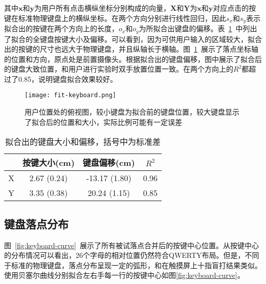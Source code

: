 其中$\textbf{x}$和$\textbf{y}$为用户所有点击横纵坐标分别构成的向量，$\textbf{X}$和$\textbf{Y}$为$\textbf{x}$和$\textbf{y}$对应点击的按键在标准物理键盘上的横纵坐标。在两个方向分别进行线性回归，因此$s_{x}$和$s_{y}$表示拟合出的按键在两个方向上的长度，$o_{x}$和$o_{y}$为所拟合出键盘的偏移。表~\ref{tab:fitkeyboard}~中列出了拟合的全键盘按键大小及偏移。可以看到，因为可供用户输入的区域较大，拟合出的按键的尺寸也远大于物理键盘，并且纵轴长于横轴。图~\ref{fig:fitkeyboard}~展示了落点坐标轴的位置和方向，原点处是前置摄像头。根据拟合出的键盘偏移，图中展示了拟合后的键盘大致位置，和用户进行实验时双手放置位置一致。在两个方向上的$R^{2}$都超过了0.85，说明键盘拟合效果较好。

\begin{figure}[h] %
  \centering
  \texttt{[image: fit-keyboard.png]}
  \caption{用户位置处的俯视图，较小键盘为拟合前的键盘位置，较大键盘显示了拟合后的位置和大小，实际比例可能有一定误差}
  \label{fig:fitkeyboard}
\end{figure}

\begin{table}[htb]
  \centering
  \begin{minipage}[t]{0.55\linewidth} %
  \caption[拟合出的键盘参数]{拟合出的键盘大小和偏移，括号中为标准差}
  \label{tab:fitkeyboard}
    \centering
    \begin{tabularx}{\linewidth}{cccc}
      \toprule[1.5pt]
      & 按键大小(cm) & 键盘偏移(cm) & $R^{2}$ \\\midrule[1pt]
      X & 2.67 (0.24) & -13.17 (1.80) & 0.96 \\
      Y & 3.35 (0.38) & 20.24 (1.15) & 0.85\\
      \bottomrule[1.5pt]
    \end{tabularx}
  \end{minipage}
\end{table}


\subsection{键盘落点分布}
图~\ref{fig:keyboard-curve}~展示了所有被试落点合并后的按键中心位置。从按键中心的分布情况可以看出，26个字母的相对位置仍然符合QWERTY布局。但是，不同于标准的物理键盘，落点分布呈现一定的弧形，和在触摸屏上十指盲打结果类似\cite{flatglass2011findlater}\cite{2018shitoast}。使用贝塞尔曲线分别拟合左右手每一行的按键中心如图\ref{fig:keyboard-curve}。

